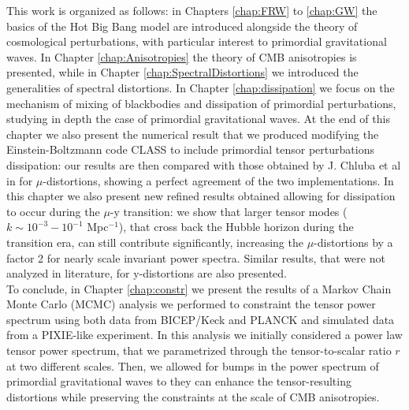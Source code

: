 This work is organized as follows: in Chapters \ref{chap:FRW} to \ref{chap:GW} the basics of the Hot Big Bang model are introduced alongside the theory of cosmological perturbations, with particular interest to primordial gravitational waves. In Chapter \ref{chap:Anisotropies} the theory of CMB anisotropies is presented, while in Chapter \ref{chap:SpectralDistortions} we introduced the generalities of spectral distortions. In Chapter \ref{chap:dissipation} we focus on the mechanism of mixing of blackbodies and dissipation of primordial perturbations, studying in depth the case of primordial gravitational waves. At the end of this chapter we also present the numerical result that we produced modifying the Einstein-Boltzmann code CLASS \cite{CLASS} to include primordial tensor perturbations dissipation: our results are then compared with those obtained by J. Chluba et al in \cite{Chluba_tens_diss} for $\mu$-distortions, showing a perfect agreement of the two implementations. In this chapter we also present new refined results obtained allowing for dissipation to occur during the $\mu$-y transition: we show that larger tensor modes ($k\sim 10^{-3}-10^{-1}$ Mpc$^{-1}$), that cross back the Hubble horizon during the transition era, can still contribute significantly, increasing the $\mu$-distortions by a factor 2 for nearly scale invariant power spectra. Similar results, that were not analyzed in literature, for y-distortions are also presented.\\
To conclude, in Chapter \ref{chap:constr} we present the results of a Markov Chain Monte Carlo (MCMC) analysis we performed to constraint the tensor power spectrum using both data from BICEP/Keck \cite{Ade_2021} and PLANCK \cite{planck2018results} and simulated data from a PIXIE-like experiment. In this analysis we initially considered a power law tensor power spectrum, that we parametrized through the tensor-to-scalar ratio $r$ at two different scales. Then, we allowed for bumps in the power spectrum of primordial gravitational waves to they can enhance the tensor-resulting distortions while preserving the constraints at the scale of CMB anisotropies.    